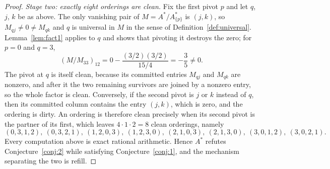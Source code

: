 \documentclass[11pt]{article}
\theoremstyle{plain}
\theoremstyle{definition}
\theoremstyle{remark}
\begin{document}
\begin{aiblock}
\begin{proof}
\emph{Stage two: exactly eight orderings are clean.} Fix the first pivot $p$ and let $q$, $j$, $k$ be
as above. The only vanishing pair of $M=A^*/A^*_{\{p\}}$ is $(j,k)$, so $M_{qj}\neq0\neq M_{qk}$ and
$q$ is universal in $M$ in the sense of Definition~\ref{def:universal}. Lemma~\ref{lem:fact1} applies
to $q$ and shows that pivoting it destroys the zero; for $p=0$ and $q=3$,
\[
  (M/M_{33})_{12}=0-\frac{(3/2)(3/2)}{15/4}=-\frac35\neq0 .
\]
The pivot at $q$ is itself clean, because its committed entries $M_{qj}$ and $M_{qk}$ are nonzero, and
after it the two remaining survivors are joined by a nonzero entry, so the whole factor is clean.
Conversely, if the second pivot is $j$ or $k$ instead of $q$, then its committed column contains the
entry $(j,k)$, which is zero, and the ordering is dirty. An ordering is therefore clean precisely when
its second pivot is the partner of its first, which leaves $4\cdot1\cdot2=8$ clean orderings, namely
\[
  (0,3,1,2),\ (0,3,2,1),\ (1,2,0,3),\ (1,2,3,0),\ (2,1,0,3),\ (2,1,3,0),\ (3,0,1,2),\ (3,0,2,1).
\]
Every computation above is exact rational arithmetic. Hence $A^*$ refutes
Conjecture~\ref{conj:2} while satisfying Conjecture~\ref{conj:1}, and the mechanism separating the two
is refill.
\end{proof}
\end{aiblock}
\end{document}

